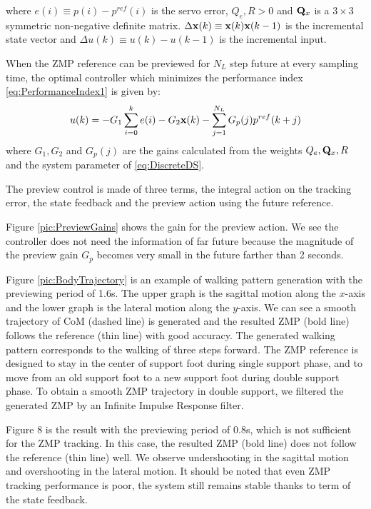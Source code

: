 where $e(i) \equiv p(i) - p^{ref}(i)$ is the servo error, $Q_e,R > 0$ and ${\bf Q}_x$ is 
a $3 \times 3$ symmetric non-negative definite matrix.
$\Delta {\bf x} (k) \equiv {\bf x}(k) {\bf x}(k-1)$ is the incremental state vector
and $\Delta u(k) \equiv u(k) - u(k-1)$ is the incremental input.
\par
When the ZMP reference can be previewed for $N_L$ step future at every sampling time,
the optimal controller which minimizes the performance index \ref{eq:PerformanceIndex1}
is given by:
\begin{equation}
u(k) = -G_1 \sum^k_{i=0} e(i) - G_2{\bf x}(k) - \sum^{N_L}_{j=1}G_p(j) p^{ref}(k+j)
\end{equation}
where $G_1, G_2$ and $G_p(j)$ are the gains calculated from the weights $Q_e, {\bf Q}_x, R$
and the system parameter of \ref{eq:DiscreteDS}.
\par 
The preview control is made of three terms, the integral action on the tracking error,
the state feedback and the preview action using the future reference.
\par
Figure \ref{pic:PreviewGains} shows the gain for the preview action. We see the controller does not need
the information of far future because the magnitude of the preview gain $G_p$ becomes
very small in the future farther than 2 seconds.
\par
Figure \ref{pic:BodyTrajectory} is an example of walking pattern generation with the previewing period of 1.6s.
The upper graph is the sagittal motion along the $x$-axis and the lower graph is the
lateral motion along the $y$-axis. We can see a smooth trajectory of CoM (dashed line)
is generated and the resulted ZMP (bold line) follows the reference (thin line) with good
accuracy. The generated walking pattern corresponds to the walking of three steps forward.
The ZMP reference is designed to stay in the center of support foot during single
support phase, and to move from an old support foot to a new support foot during double
support phase. 
To obtain a smooth ZMP trajectory in double support, we filtered the generated ZMP
by an Infinite Impulse Response filter.
\par
Figure 8 is the result with the previewing period of 0.8s, which is not sufficient for the
ZMP tracking. In this case, the resulted ZMP (bold line) does not follow the reference
(thin line) well. We observe undershooting in the sagittal motion and overshooting in the 
lateral motion. It should be noted that even ZMP tracking performance is poor, the 
system still remains stable thanks to term of the state feedback.
